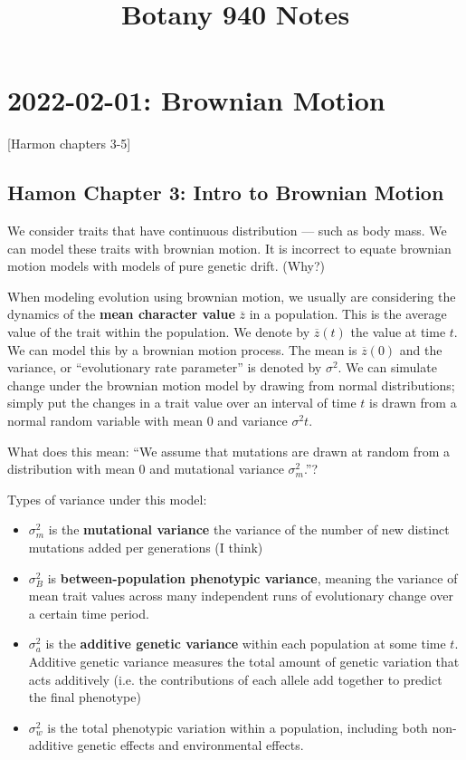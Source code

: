 \documentclass{article}
\title{Botany 940 Notes}
\newcommand{\advar}{\sigma_{a}^{2}} %
\newcommand{\bvar}{\sigma_{B}^{2}}  %
\newcommand{\mvar}{\sigma_{m}^{2}}  %
\newcommand{\wvar}{\sigma_{w}^{2}}  %
\begin{document}
\maketitle

\section{2022-02-01: Brownian Motion}
[Harmon chapters 3-5]

\subsection{Hamon Chapter 3: Intro to Brownian Motion}
We consider traits that have continuous distribution --- such as body mass. We
can model these traits with brownian motion. It is incorrect to equate brownian
motion models with models of pure genetic drift. (Why?)

When modeling evolution using brownian motion, we usually are considering the
dynamics of the \textbf{mean character value} $\overline{z}$ in a population.
This is the average value of the trait within the population. We denote by
$\overline{z}(t)$ the value at time $t$. We can model this by a brownian motion
process. The mean is $\overline{z}(0)$ and the variance, or ``evolutionary rate
parameter'' is denoted by $\sigma^{2}$. We can simulate change under the
brownian motion model by drawing from normal distributions; simply put the
changes in a trait value over an interval of time $t$ is drawn from a normal
random variable with mean 0 and variance $\sigma^{2}t$.


What does this mean: ``We assume that mutations are drawn at random from a
distribution with mean 0 and mutational variance $\sigma_{m}^{2}$.''?
\begin{definition}
Types of variance under this model:
\begin{itemize}
  \item $\mvar$ is the \textbf{mutational variance} the variance of the number of
    new distinct mutations added per generations (I think)
  \item $\bvar$ is \textbf{between-population phenotypic variance}, meaning the
    variance of mean trait values across many independent runs of evolutionary
    change over a certain time period.
  \item $\advar$ is the \textbf{additive genetic variance} within each
    population at some time $t$. Additive genetic variance measures the total
    amount of genetic variation that acts additively (i.e. the contributions of
    each allele add together to predict the final phenotype)
  \item $\wvar$ is the total phenotypic variation within a population, including
    both non-additive genetic effects and environmental effects.
\end{itemize}
\end{definition}
\end{document}
